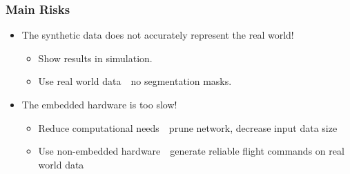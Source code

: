 \documentclass[aspectratio=169]{rubeamer}
\newif\ifpause
\newcommand{\mypause}{\ifpause \pause \fi}
\begin{document}
\begin{frame}
  \frametitle{Main Risks}
  \begin{itemize}
    \item The synthetic data does not accurately represent the real world!
    \mypause
    \begin{itemize}
      \item Show results in simulation.
      \mypause
      \item Use real world data\mypause~\textrightarrow~no segmentation masks.
    \end{itemize}
    \mypause
    \item The embedded hardware is too slow!
    \mypause
    \begin{itemize}
      \item Reduce computational needs\mypause~\textrightarrow~prune network, decrease input data size\mypause
      \item Use non-embedded hardware\mypause~\textrightarrow~generate reliable flight commands on real world data
    \end{itemize}
  \end{itemize}
\end{frame}
\end{document}
